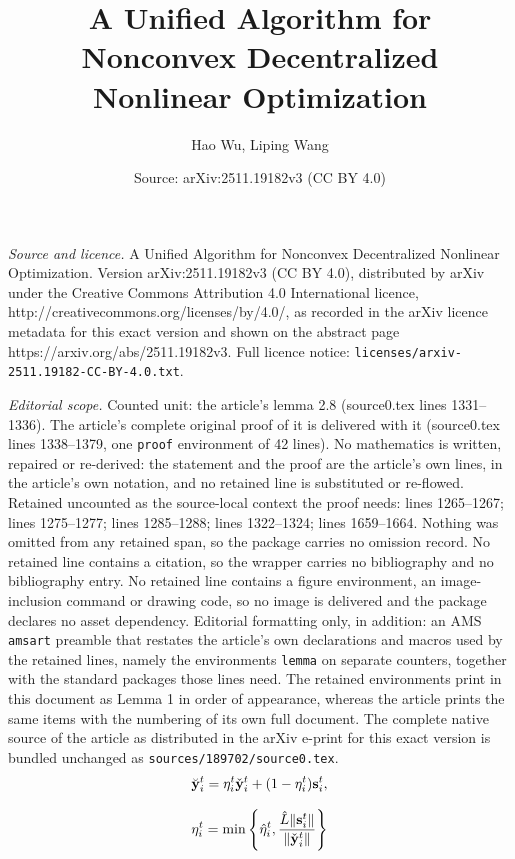 \documentclass[10pt,a4paper]{amsart}
\title{A Unified Algorithm for Nonconvex Decentralized Nonlinear Optimization}
\author{Hao Wu, Liping Wang}
\date{Source: arXiv:2511.19182v3 (CC BY 4.0)}
\newcommand{\m}[1]{{\bf{#1}}}
\begin{document}
\maketitle

\noindent\emph{Source and licence.} A Unified Algorithm for Nonconvex Decentralized Nonlinear Optimization. Version arXiv:2511.19182v3 (CC BY 4.0), distributed by arXiv under the Creative Commons Attribution 4.0 International licence, http://creativecommons.org/licenses/by/4.0/, as recorded in the arXiv licence metadata for this exact version and shown on the abstract page https://arxiv.org/abs/2511.19182v3. Full licence notice: \texttt{licenses/arxiv-2511.19182-CC-BY-4.0.txt}.\par\smallskip

\noindent\textit{Editorial scope.} Counted unit: the article's lemma 2.8 (source0.tex lines 1331--1336). The article's complete original proof of it is delivered with it (source0.tex lines 1338--1379, one \texttt{proof} environment of 42 lines). No mathematics is written, repaired or re-derived: the statement and the proof are the article's own lines, in the article's own notation, and no retained line is substituted or re-flowed.  Retained uncounted as the source-local context the proof needs: lines 1265--1267; lines 1275--1277; lines 1285--1288; lines 1322--1324; lines 1659--1664.  Nothing was omitted from any retained span, so the package carries no omission record.  No retained line contains a citation, so the wrapper carries no bibliography and no bibliography entry.  No retained line contains a figure environment, an image-inclusion command or drawing code, so no image is delivered and the package declares no asset dependency.  Editorial formatting only, in addition: an AMS \texttt{amsart} preamble that restates the article's own declarations and macros used by the retained lines, namely the environments \texttt{lemma} on separate counters, together with the standard packages those lines need.  The retained environments print in this document as Lemma 1 in order of appearance, whereas the article prints the same items with the numbering of its own full document.  The complete native source of the article as distributed in the arXiv e-print for this exact version is bundled unchanged as \texttt{sources/189702/source0.tex}.
\begin{equation}\label{brevey}
	\breve{\m{y}}^{t}_i=\eta_i^t\check{\m{y}}^{t}_i+(1-\eta_i^t)\m{s}^{t}_{i},
\end{equation}

\begin{equation}\label{etait}
	\eta_i^t=\min\left\{\hat{\eta}_i^t,\frac{\hat{L}\|\m{s}^{t}_{i}\|}{\|\check{\m{y}}^{t}_i\|}\right\}
\end{equation}
\end{document}
